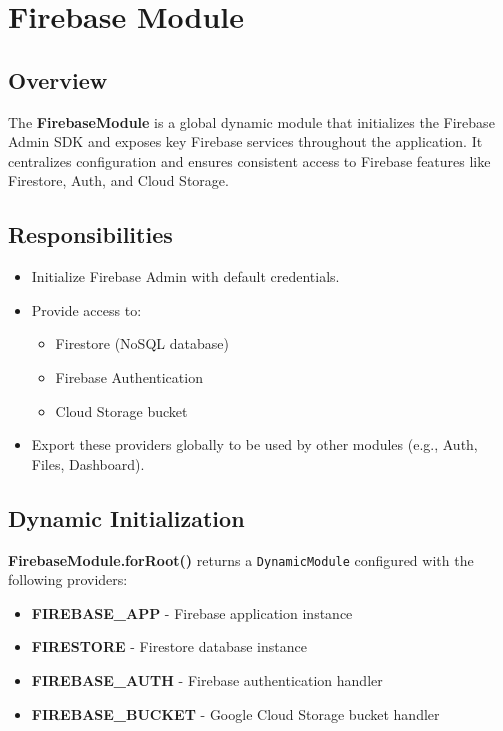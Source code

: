 \section{Firebase Module}

\subsection*{Overview}

The \textbf{FirebaseModule} is a global dynamic module that initializes the Firebase Admin SDK and exposes key Firebase services throughout the application. It centralizes configuration and ensures consistent access to Firebase features like Firestore, Auth, and Cloud Storage.

\subsection*{Responsibilities}

\begin{itemize}
    \item Initialize Firebase Admin with default credentials.
    \item Provide access to:
        \begin{itemize}
            \item Firestore (NoSQL database)
            \item Firebase Authentication
            \item Cloud Storage bucket
        \end{itemize}
    \item Export these providers globally to be used by other modules (e.g., Auth, Files, Dashboard).
\end{itemize}

\subsection*{Dynamic Initialization}

\textbf{FirebaseModule.forRoot()} returns a \texttt{DynamicModule} configured with the following providers:

\begin{itemize}
    \item \textbf{FIREBASE\_APP} - Firebase application instance
    \item \textbf{FIRESTORE} - Firestore database instance
    \item \textbf{FIREBASE\_AUTH} - Firebase authentication handler
    \item \textbf{FIREBASE\_BUCKET} - Google Cloud Storage bucket handler
\end{itemize}

